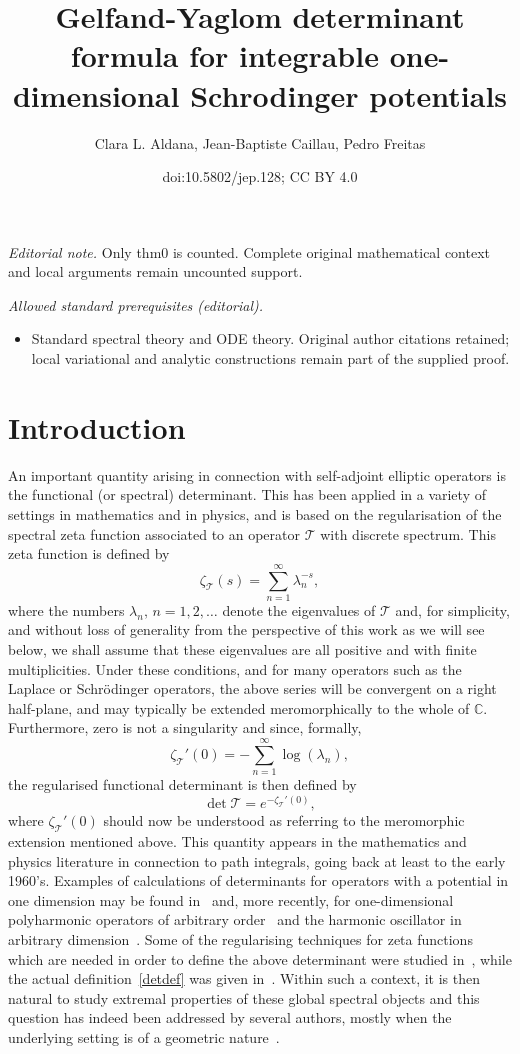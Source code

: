 \documentclass[11pt]{article}
\title{Gelfand-Yaglom determinant formula for integrable one-dimensional Schrodinger potentials}
\author{Clara L. Aldana, Jean-Baptiste Caillau, Pedro Freitas}
\date{doi:10.5802/jep.128; CC BY 4.0}
\theoremstyle{plain}
\theoremstyle{definition}
\newcommand{\CM}{\mathbb{C}}
\newcommand{\ttt}{\mathscr{T}}
\begin{document}
\maketitle
\noindent\textit{Editorial note.} Only thm0 is counted. Complete original mathematical context and local arguments remain uncounted support.\par\medskip
\noindent\textit{Allowed standard prerequisites (editorial).}\begin{itemize}
\item Standard spectral theory and ODE theory. Original author citations retained; local variational and analytic constructions remain part of the supplied proof.
\end{itemize}\medskip
\section*{Introduction}
An important quantity arising in connection with self-adjoint elliptic operators is the functional (or spectral)
determinant. This has been applied in a variety of settings in mathematics and in physics, and is based on the regularisation of the
spectral zeta function associated to an operator $\ttt$ with discrete spectrum. This zeta function is defined by
\begin{equation}\label{zetaT}
\zeta_{\ttt}(s) = \sum_{n=1}^{\infty} \lambda_{n}^{-s},
\end{equation}
where the numbers $\lambda_{n}, \, n=1,2,\ldots$ denote the eigenvalues of $\ttt$ and,
for simplicity, and without loss of generality from the perspective of this work as we will see below, we shall assume that these
eigenvalues are all positive and with finite multiplicities.
Under these conditions, and for many operators such as the Laplace or Schrödinger operators, the above series will be convergent
on a right half-plane, and may typically be extended meromorphically to the whole of $\CM$. Furthermore, zero
is not a singularity and since, formally,
\[
\zeta_{\ttt}'(0) = -\sum_{n=1}^{\infty} \log(\lambda_{n}),
\]
the regularised functional determinant is then defined by
\begin{equation}\label{detdef}
\det\ttt = e^{-\zeta_{\ttt}'(0)},
\end{equation}
where $\zeta_{\ttt}'(0)$ should now be understood as referring to the meromorphic extension mentioned above. This
quantity appears in the mathematics and physics literature in connection to path integrals, going back at least to the early 1960's. Examples
of calculations of determinants for operators with a potential in one dimension may be found in~\cite{BFK,geya,Levit-Smilansky} and, more recently,
for one-dimensional polyharmonic operators of arbitrary order~\cite{fl} and the harmonic oscillator in arbitrary dimension~\cite{frei}. Some
of the regularising techniques for zeta functions which are needed in order
to define the above determinant were studied in~\cite{mipl}, while the actual definition~\eqref{detdef} was given in~\cite{rasi}.
Within such a context, it is then natural to study extremal properties of these global spectral objects and this
question has indeed been addressed by several authors, mostly when the underlying setting is of a geometric nature~\cite{aursal,ops,okik,aar}.
\end{document}
